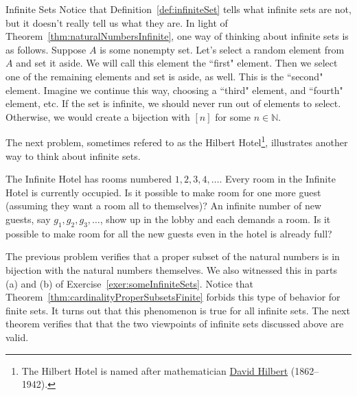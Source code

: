 \begin{section}{Infinite Sets}
Notice that Definition~\ref{def:infiniteSet} tells what infinite sets are not, but it doesn't really tell us what they are. In light of Theorem~\ref{thm:naturalNumbersInfinite}, one way of thinking about infinite sets is as follows.  Suppose $A$ is some nonempty set. Let's select a random element from $A$ and set it aside. We will call this element the ``first" element.  Then we select one of the remaining elements and set is aside, as well.  This is the ``second" element.  Imagine we continue this way, choosing a ``third" element, and ``fourth" element, etc.  If the set is infinite, we should never run out of elements to select. Otherwise, we would create a bijection with $[n]$ for some $n\in\mathbb{N}$.

The next problem, sometimes refered to as the Hilbert Hotel\footnote{The Hilbert Hotel is named after mathematician \href{https://en.wikipedia.org/wiki/David_Hilbert}{David Hilbert} (1862--1942).}, illustrates another way to think about infinite sets.

\begin{problem}
The Infinite Hotel has rooms numbered $1,2,3,4,\ldots$. Every room in the Infinite Hotel is currently occupied.  Is it possible to make room for one more guest (assuming they want a room all to themselves)?  An infinite number of new guests, say $g_1, g_2,g_3,\ldots$, show up in the lobby and each demands a room.  Is it possible to make room for all the new guests even in the hotel is already full?
\end{problem}

The previous problem verifies that a proper subset of the natural numbers is in bijection with the natural numbers themselves. We also witnessed this in parts (a) and (b) of Exercise~\ref{exer:someInfiniteSets}. Notice that Theorem~\ref{thm:cardinalityProperSubsetsFinite} forbids this type of behavior for finite sets. It turns out that this phenomenon is true for all infinite sets. The next theorem verifies that that the two viewpoints of infinite sets discussed above are valid.


\end{section}
